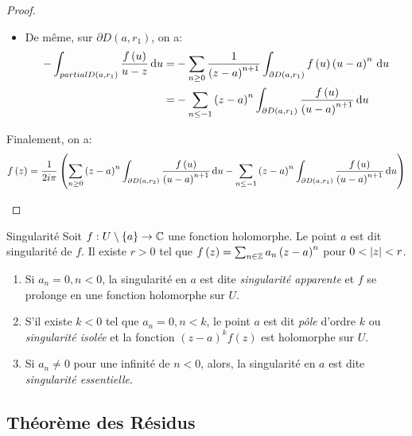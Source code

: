 \documentclass{cours}
\begin{document}
\begin{proof}
\begin{description}
\begin{itemize}
				\item De même, sur $\partial D\left(a, r_{1}\right)$, on a:
					\begin{equation*}
						\begin{aligned}
							- \int_{partial D\left(a, r_{1}\right)} \frac{f\left(u\right)}{u - z} {\rm \, d} u =& - \sum_{n \geq 0} \frac{1}{\left(z - a\right)^{n + 1}} \int_{\partial D\left(a, r_{1}\right)} f\left(u\right) \left(u - a\right)^{n} {\rm \, d} u\\
								=& - \sum_{n \leq -1} \left(z - a\right)^{n} \int_{\partial D\left(a, r_{1}\right)} \frac{f\left(u\right)}{\left(u - a\right)^{n + 1}}{\rm \, d} u
						\end{aligned}
					\end{equation*}
			\end{itemize}
			Finalement, on a:
			\begin{equation*}
				f\left(z\right) = \frac{1}{2i \pi}\left(\sum_{n \geq 0} \left(z - a\right)^{n}\int_{\partial D\left(a, r_{2}\right)}\frac{f\left(u\right)}{\left(u - a\right)^{n + 1}}{\rm \, d} u - \sum_{n \leq - 1}\left(z - a\right)^{n}\int_{\partial D\left(a, r_{1}\right)}\frac{f\left(u\right)}{\left(u- a\right)^{n + 1}}{\rm \, d} u\right)
			\end{equation*}
	\end{description}
\end{proof}

\begin{définition}
	{Singularité}{}
	Soit $f : U \setminus \{a\} \to \mathbb{C}$ une fonction holomorphe. Le point $a$ est dit singularité de $f$. 
	Il existe $r > 0$ tel que $f\left(z\right) = \sum_{n \in \mathbb{Z}}a_{n} \left(z- a\right)^{n}$ pour $0 < \left|z\right| < r$.
	\begin{enumerate}
		\item Si $a_{n} = 0, n < 0$, la singularité en $a$ est dite \emph{singularité apparente} et $f$ se prolonge en une fonction holomorphe sur $U$. 
		\item S'il existe $k < 0$ tel que $a_{n} = 0, n < k$, le point $a$ est dit \emph{pôle} d'ordre $k$ ou \emph{singularité isolée} et la fonction $\left(z - a\right)^{k}f\left(z\right)$ est holomorphe sur $U$. 
		\item Si $a_{n} \neq 0$ pour une infinité de $n < 0$, alors, la singularité en $a$ est dite \emph{singularité essentielle}.
	\end{enumerate}
\end{définition}

\subsection{Théorème des Résidus}
\end{document}
